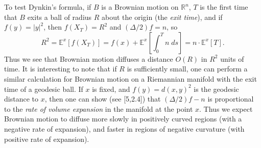 \documentclass[12pt]{article}
\newcommand*{\R}{\mathbb{R}}
\begin{document}
%
To test Dynkin's formula, if $B$ is a Brownian motion on $\R^n$, $T$ is the first time that $B$ exits a ball of radius $R$ about the origin (the \emph{exit time}), and if $f(y) = |y|^2$, then $f(X_T) = R^2$ and $(\Delta/2) f = n$, so
%
\[ R^2 = \mathbb{E}^x[f(X_T)] = f(x) + \mathbb{E}^x \left[ \int_0^T n\; ds \right] = n \cdot \mathbb{E}^x[T]. \]
%
Thus we see that Brownian motion diffuses a distance $O(R)$ in $R^2$ units of time. It is interesting to note that if $R$ is sufficiently small, one can perform a similar calculation for Brownian motion on a Riemannian manifold with the exit time of a geodesic ball. If $x$ is fixed, and $f(y) = d(x,y)^2$ is the geodesic distance to $x$, then one can show (see [5,2.4]) that $(\Delta/2) f - n$ is proportional to the \emph{rate of volume expansion} in the manifold at the point $x$.
%
Thus we expect Brownian motion to diffuse more slowly in positively curved regions (with a negative rate of expansion), and faster in regions of negative curvature (with positive rate of expansion).
\end{document}
